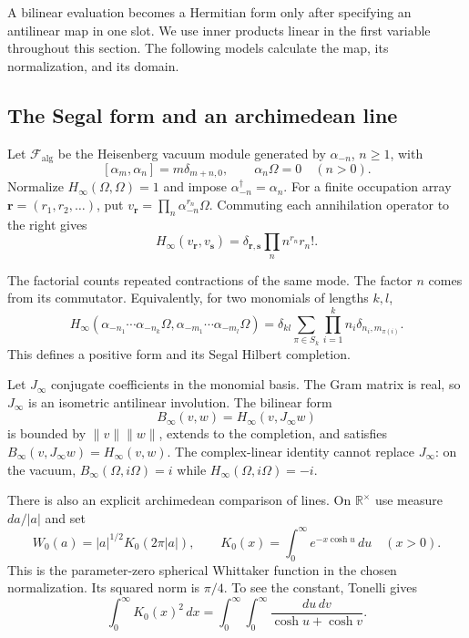 A bilinear evaluation becomes a Hermitian form only after specifying an
antilinear map in one slot. We use inner products linear in the first
variable throughout this section. The following models calculate the map,
its normalization, and its domain.

\subsection{The Segal form and an archimedean line}

Let $\mathscr F_{\mathrm{alg}}$ be the Heisenberg vacuum module generated by
$\alpha_{-n}$, $n\geq1$, with
\[
 [\alpha_m,\alpha_n]=m\delta_{m+n,0},\qquad
 \alpha_n\Omega=0\quad(n>0).
\]
Normalize $H_\infty(\Omega,\Omega)=1$ and impose
$\alpha_{-n}^\dagger=\alpha_n$. For a finite occupation array $\mathbf
r=(r_1,r_2,\ldots)$, put $v_{\mathbf r}=\prod_n\alpha_{-n}^{r_n}\Omega$.
Commuting each annihilation operator to the right gives
\begin{equation}
\label{v4-arith:traces:segal-gram}
 H_\infty(v_{\mathbf r},v_{\mathbf s})
  =\delta_{\mathbf r,\mathbf s}\prod_n n^{r_n}r_n!.
\end{equation}

The factorial counts repeated contractions of the same mode. The factor $n$
comes from its commutator. Equivalently, for two monomials of lengths $k,l$,
\[
 H_\infty(\alpha_{-n_1}\cdots\alpha_{-n_k}\Omega,
          \alpha_{-m_1}\cdots\alpha_{-m_l}\Omega)
  =\delta_{kl}\sum_{\pi\in S_k}
                   \prod_{i=1}^k n_i\delta_{n_i,m_{\pi(i)}}.
\]
This defines a positive form and its Segal Hilbert completion.

Let $J_\infty$ conjugate coefficients in the monomial basis. The Gram matrix
is real, so $J_\infty$ is an isometric antilinear involution. The bilinear
form
\[
 B_\infty(v,w)=H_\infty(v,J_\infty w)
\]
is bounded by $\|v\|\|w\|$, extends to the completion, and satisfies
$B_\infty(v,J_\infty w)=H_\infty(v,w)$. The complex-linear identity cannot
replace $J_\infty$: on the vacuum, $B_\infty(\Omega,i\Omega)=i$ while
$H_\infty(\Omega,i\Omega)=-i$.

There is also an explicit archimedean comparison of lines. On $\mathbb
R^\times$ use measure $da/|a|$ and set
\[
 W_0(a)=|a|^{1/2}K_0(2\pi|a|),\qquad
 K_0(x)=\int_0^\infty e^{-x\cosh u}\,du\quad(x>0).
\]
This is the parameter-zero spherical Whittaker function in the chosen
normalization. Its squared norm is $\pi/4$. To see the constant, Tonelli
gives
\[
 \int_0^\infty K_0(x)^2\,dx
  =\int_0^\infty\int_0^\infty
                \frac{du\,dv}{\cosh u+\cosh v}.
\]

